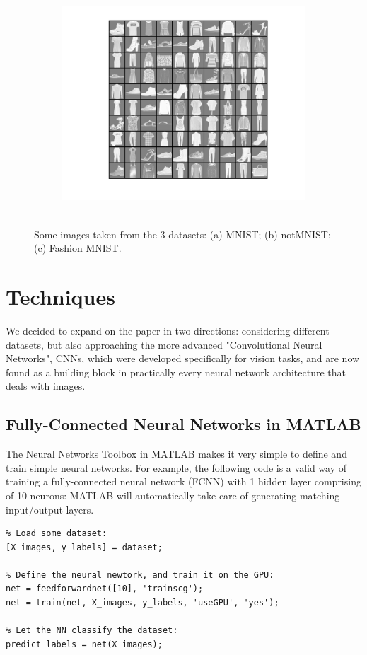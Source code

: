 \documentclass[letterpaper,12pt]{article}
\begin{document}
\begin{figure}[hbt]
\begin{subfigure}{.3\textwidth}
  \includegraphics[width=\linewidth]{fashion_example}
  \caption{~}
\end{subfigure}
\caption{Some images taken from the 3 datasets: (a) MNIST; (b) notMNIST; (c) Fashion MNIST.}
\label{fig:dataset_example}
\end{figure}


\section{Techniques}

We decided to expand on the paper in two directions: considering different datasets, but also approaching the more advanced "Convolutional Neural Networks", CNNs, which were developed specifically for vision tasks, and are now found as a building block in practically every neural network architecture that deals with images. 

\subsection*{Fully-Connected Neural Networks in MATLAB}

The Neural Networks Toolbox in MATLAB makes it very simple to define and train simple neural networks. For example, the following code is a valid way of training a fully-connected neural network (FCNN) with 1 hidden layer comprising of 10 neurons: MATLAB will automatically take care of generating matching input/output layers. \\

\begin{lstlisting}
% Load some dataset:
[X_images, y_labels] = dataset;

% Define the neural newtork, and train it on the GPU:
net = feedforwardnet([10], 'trainscg');
net = train(net, X_images, y_labels, 'useGPU', 'yes');

% Let the NN classify the dataset:
predict_labels = net(X_images); 
\end{lstlisting}
\end{document}
